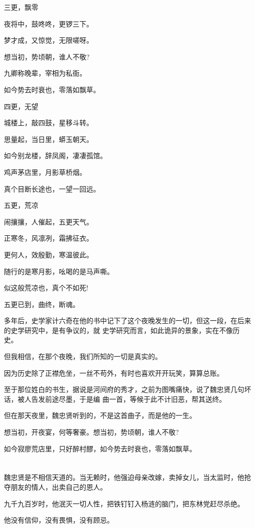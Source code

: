 \documentclass[11pt,a4paper,onecolumn]{article}
\begin{document}
三更，飘零

夜将中，鼓咚咚，更锣三下。

梦才成，又惊觉，无限嗟呀。

想当初，势顷朝，谁人不敬?

九卿称晚辈，宰相为私衙。

如今势去时衰也，零落如飘草。

四更，无望

城楼上，敲四鼓，星移斗转。

思量起，当日里，蟒玉朝天。

如今别龙楼，辞凤阁，凄凄孤馆。

鸡声茅店里，月影草桥烟。

真个目断长途也，一望一回远。

五更，荒凉

闹攘攘，人催起，五更天气。

正寒冬，风凛冽，霜拂征衣。

更何人，效殷勤，寒温彼此。

随行的是寒月影，吆喝的是马声嘶。

似这般荒凉也，真个不如死!

五更已到，曲终，断魂。

多年后，史学家计六奇在他的书中记下了这个夜晚发生的一切，但这一段，在后来的史学研究中，是有争议的，就
史学研究而言，如此诡异的景象，实在不像历史。

但我相信，在那个夜晚，我们所知的一切是真实的。

因为历史除了正襟危坐，一丝不苟外，有时也喜欢开开玩笑，算算总账。

至于那位姓白的书生，据说是河间府的秀才，之前为图嘴痛快，说了魏忠贤几句坏话，被人告发前途尽墨，于是编
曲一首，等候于此不计旧恶，帮其送终。

但在那天夜里，魏忠贤听到的，不是这首曲子，而是他的一生。

想当初，开夜宴，何等奢豪。想当初，势顷朝，谁人不敬?

如今寂廖荒店里，只好醉村醪，如今势去时衰也，零落如飘草。

\section[\thesection]{}

魏忠贤是不相信天道的。当无赖时，他强迫母亲改嫁，卖掉女儿，当太监时，他抢夺朋友的情人，出卖自己的恩人。

九千九百岁时，他泯灭一切人性，把铁钉钉入杨涟的脑门，把东林党赶尽杀绝。

他没有信仰，没有畏惧，没有顾忌。
\end{document}

